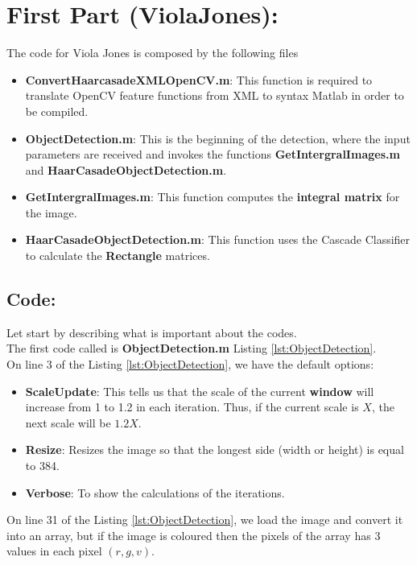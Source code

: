 \section{First Part (ViolaJones):}
The code for Viola Jones is composed by the following files
\begin{itemize}
	\item \textbf{ConvertHaarcasadeXMLOpenCV.m}: This function is required to translate OpenCV feature functions from XML to syntax Matlab in order to be compiled.
	\item \textbf{ObjectDetection.m}: This is the beginning of the detection, where the input parameters are received and invokes the functions \textbf{GetIntergralImages.m} and  \textbf{HaarCasadeObjectDetection.m}.
\item \textbf{GetIntergralImages.m}: This function computes the \textbf{integral matrix} for the image.
\item \textbf{HaarCasadeObjectDetection.m}: This function uses the Cascade Classifier to calculate the \textbf{Rectangle} matrices. 
\end{itemize}

\subsection{Code:}
\noindent Let start by describing what is important about the codes.\\
\noindent The first code called is \textbf{ObjectDetection.m} Listing \ref{lst:ObjectDetection}.\\%
\noindent On line 3 of the Listing \ref{lst:ObjectDetection}, we have the default options:
\begin{itemize}
	\item \textbf{ScaleUpdate}: This tells us that the scale of the current \textbf{window} will increase from 1 to 1.2 in each iteration. Thus, if the current scale is $X$, the next scale will be $1.2X$. 
	\item \textbf{Resize}: Resizes the image so that the longest side (width or height) is equal to 384.
	\item \textbf{Verbose}: To show the calculations of the iterations.
\end{itemize}

\noindent On line 31 of the Listing \ref{lst:ObjectDetection}, we load the image and convert it into an array, but if the image is coloured then the pixels of the array has 3 values in each pixel $(r,g,v)$.\\

